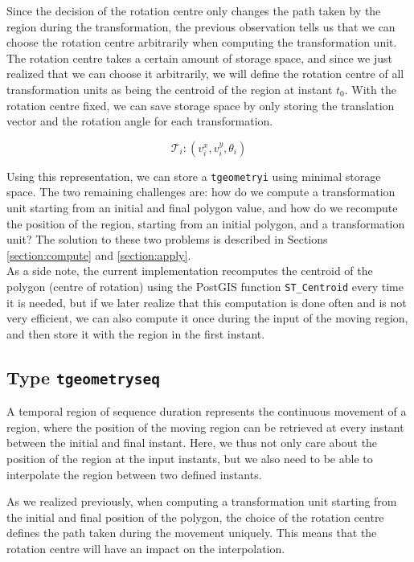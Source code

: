 Since the decision of the rotation centre only changes the path taken by the region during the transformation, the previous observation tells us that we can choose the rotation centre arbitrarily when computing the transformation unit. \\

The rotation centre takes a certain amount of storage space, and since we just realized that we can choose it arbitrarily, we will define the rotation centre of all transformation units as being the centroid of the region at instant $t_0$. With the rotation centre fixed, we can save storage space by only storing the translation vector and the rotation angle for each transformation. 

\[
    \mathcal{T}_i: (v_i^x, v_i^y, \theta_i)
\]

Using this representation, we can store a \lstinline{tgeometryi} using minimal storage space. The two remaining challenges are: how do we compute a transformation unit starting from an initial and final polygon value, and how do we recompute the position of the region, starting from an initial polygon, and a transformation unit? The solution to these two problems is described in Sections \ref{section:compute} and \ref{section:apply}. \\

As a side note, the current implementation recomputes the centroid of the polygon (centre of rotation) using the PostGIS function \lstinline{ST_Centroid} every time it is needed, but if we later realize that this computation is done often and is not very efficient, we can also compute it once during the input of the moving region, and then store it with the region in the first instant.

\subsection{Type \texttt{tgeometryseq}}
\label{section:internal_repr_seq}

A temporal region of sequence duration represents the continuous movement of a region, where the position of the moving region can be retrieved at every instant between the initial and final instant. Here, we thus not only care about the position of the region at the input instants, but we also need to be able to interpolate the region between two defined instants.

As we realized previously, when computing a transformation unit starting from the initial and final position of the polygon, the choice of the rotation centre defines the path taken during the movement uniquely. This means that the rotation centre will have an impact on the interpolation. \\

